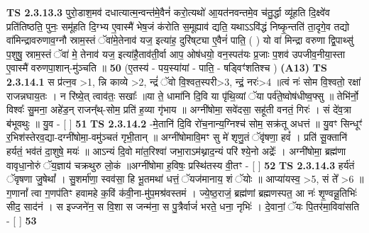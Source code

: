 \documentclass[17pt]{extarticle}
\begin{document}
                  \newline
                                \textbf{ TS 2.3.13.3} \newline
                  पुरो॒डाश॒मव॑ दधात्यात्म॒न्वन्त॑मे॒वैनं॑ करो॒त्यथो॑ आ॒यत॑नवन्तमे॒व च॑तु॒र्द्धा व्यू॑हति दि॒क्ष्वे॑व प्रति॑तिष्ठति॒ पुनः॒ समू॑हति दि॒ग्भ्य ए॒वास्मै॑ भेष॒जं क॑रोति स॒मूह्याव॑ द्यति॒ यथाऽऽवि॑द्धं निष्कृ॒न्तति॑ ता॒दृगे॒व तद्यो वा॑मिन्द्रावरुणाव॒ग्नौ स्राम॒स्तं ॅवा॑मे॒तेनाव॑ यज॒ इत्या॑ह॒ दुरि॑ष्‌ट्या ए॒वैनं॑ पाति॒ ( ) यो वा॑ मिन्द्रा वरुणा द्वि॒पाथ्सु॑ प॒शुषु॒ स्राम॒स्तं ॅवा॑ मे॒ तेनाव॑ यज॒ इत्या॑है॒ताव॑ती॒र्वा आप॒ ओष॑धयो॒ वन॒स्पत॑यः प्र॒जाः प॒शव॑ उपजीव॒नीया॒स्ता ए॒वास्मै॑ वरुणपा॒शान्-मु॑ञ्चति ॥ \textbf{  50} \newline
                  \newline
                      (ए॒तस्य॑ - पय॒स्या॑यां - पाति॒ - षड्विꣳ॑शतिश्च )  \textbf{(A13)} \newline \newline
                                        \textbf{ TS 2.3.14.1} \newline
                  स प्र॑त्न॒व >1, न्नि काव्ये >2, न्द्रं॑ ॅवो वि॒श्वत॒स्परी>3, न्द्रं॒ नरः॑>4 ॥त्वं नः॑ सोम वि॒श्वतो॒ रक्षा॑ राजन्नघाय॒तः । न रि॑ष्ये॒त् त्वाव॑तः॒ सखाः᳚ ॥या ते॒ धामा॑नि दि॒वि या पृ॑थि॒व्यां ॅया पर्व॑ते॒ष्वोष॑धीष्व॒फ्सु ॥ तेभि॑र्नो॒ विश्वः᳚ सु॒मना॒ अहे॑ड॒न् राजन्᳚थ्-सोम॒ प्रति॑ ह॒व्या गृ॑भाय ॥ अग्नी॑षोमा॒ सवे॑दसा॒ सहू॑ती वनतं॒ गिरः॑ । सं दे॑व॒त्रा ब॑भूवथुः ॥ यु॒व - [  ] \textbf{  51} \newline
                  \newline
                                \textbf{ TS 2.3.14.2} \newline
                  -मे॒तानि॑ दि॒वि रो॑च॒नान्य॒ग्निश्च॑ सोम॒ सक्र॑तू अधत्तं ॥ यु॒वꣳ सिन्धूꣳ॑ र॒भिश॑स्तेरव॒द्या-दग्नी॑षोमा॒-वमु॑ञ्चतं गृभी॒तान् ॥ अग्नी॑षोमावि॒मꣳ सु मे॑ शृणु॒तं ॅवृ॑षणा॒ हवं᳚ । प्रति॑ सू॒क्तानि॑ हर्यतं॒ भव॑तं दा॒शुषे॒ मयः॑ ॥ आऽन्यं दि॒वो मा॑त॒रिश्वा॑ जभा॒राऽम॑थ्नाद॒न्यं परि॑ श्ये॒नो अद्रेः᳚ । अग्नी॑षोमा॒ ब्रह्म॑णा वावृधा॒नोरुं ॅय॒ज्ञाय॑ चक्रथुरु लो॒कं ॥अग्नी॑षोमा ह॒विषः॒ प्रस्थि॑तस्य वी॒तꣳ - [  ] \textbf{  52} \newline
                  \newline
                                \textbf{ TS 2.3.14.3} \newline
                  हर्य॑तं ॅवृषणा जु॒षेथां᳚ । सु॒शर्मा॑णा॒ स्वव॑सा॒ हि भू॒तमथा॑ धत्तं॒ ॅयज॑मानाय॒ शं ॅयोः ॥ आप्या॑यस्व॒ >5, सं ते᳚ >6 ॥ ग॒णानां᳚ त्वा ग॒णप॑तिꣳ हवामहे क॒विं क॑वी॒ना-मु॑प॒मश्र॑वस्तमं । ज्ये॒ष्ठ॒राजं॒ ब्रह्म॑णां ब्रह्मणस्पत॒ आ नः॑ शृ॒ण्वन्नू॒तिभिः॑ सीद॒ साद॑नं । स इज्जने॑न॒ स वि॒शा स जन्म॑ना॒ स पु॒त्रैर्वाजं॑ भरते॒ धना॒ नृभिः॑ । दे॒वानां॒ ॅयः पि॒तर॑मा॒विवा॑सति - [  ] \textbf{  53} \newline
\end{document}
